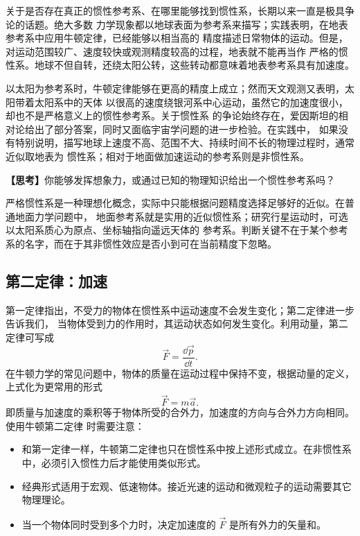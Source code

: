 关于是否存在真正的惯性参考系、在哪里能够找到惯性系，长期以来一直是极具争论的话题。绝大多数
力学现象都以地球表面为参考系来描写；实践表明，在地表参考系中应用牛顿定律，已经能够以相当高的
精度描述日常物体的运动。但是，对运动范围较广、速度较快或观测精度较高的过程，地表就不能再当作
严格的惯性系。地球不但自转，还绕太阳公转，这些转动都意味着地表参考系具有加速度。

以太阳为参考系时，牛顿定律能够在更高的精度上成立；然而天文观测又表明，太阳带着太阳系中的天体
以很高的速度绕银河系中心运动，虽然它的加速度很小，却也不是严格意义上的惯性参考系。关于惯性系
的争论始终存在，爱因斯坦的相对论给出了部分答案，同时又面临宇宙学问题的进一步检验。在实践中，
如果没有特别说明，描写地球上速度不高、范围不大、持续时间不长的物理过程时，通常近似取地表为
惯性系；相对于地面做加速运动的参考系则是非惯性系。

\noindent\textbf{【思考】}你能够发挥想象力，或通过已知的物理知识给出一个惯性参考系吗？

\begin{thinkanswer}
严格惯性系是一种理想化概念，实际中只能根据问题精度选择足够好的近似。在普通地面力学问题中，
地面参考系就是实用的近似惯性系；研究行星运动时，可选以太阳系质心为原点、坐标轴指向遥远天体的
参考系。判断关键不在于某个参考系的名字，而在于其非惯性效应是否小到可在当前精度下忽略。
\end{thinkanswer}

\subsection{第二定律：加速}

第一定律指出，不受力的物体在惯性系中运动速度不会发生变化；第二定律进一步告诉我们，
当物体受到力的作用时，其运动状态如何发生变化。利用动量，第二定律可写成
\begin{equation}
  \vec F=\frac{\dd\vec p}{\dd t}.
\end{equation}
在牛顿力学的常见问题中，物体的质量在运动过程中保持不变，根据动量的定义，上式化为更常用的形式
\begin{equation}
  \vec F=m\vec a.
\end{equation}
即质量与加速度的乘积等于物体所受的合外力，加速度的方向与合外力方向相同。使用牛顿第二定律
时需要注意：
\begin{itemize}
  \item 和第一定律一样，牛顿第二定律也只在惯性系中按上述形式成立。在非惯性系中，必须引入惯性力后才能使用类似形式。
  \item 经典形式适用于宏观、低速物体。接近光速的运动和微观粒子的运动需要其它物理理论。
  \item 当一个物体同时受到多个力时，决定加速度的 $\vec F$ 是所有外力的矢量和。
\end{itemize}

